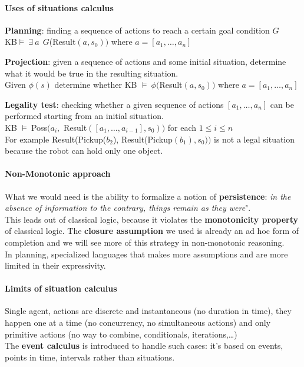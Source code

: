 \documentclass[10pt]{report}
\begin{document}
\paragraph{Uses of situations calculus} \begin{list}{}{}
	\item \textbf{Planning}: finding a sequence of actions to reach a certain goal condition $G$\\
	KB$\vDash\:\exists\:a\:\:G$(Result$(a,s_0))$ where $a = [a_1,\ldots,a_n]$
	\item \textbf{Projection}: given a sequence of actions and some initial situation, determine what it would be true in the resulting situation.\\
	Given $\phi(s)$ determine whether KB $\vDash\:\phi($Result$(a,s_0))$ where $a = [a_1,\ldots,a_n]$
	\item \textbf{Legality test}: checking whether a given sequence of actions $[a_1,\ldots,a_n]$ can be performed starting from an initial situation.\\
	KB $\vDash\:$Poss$(a_i,$ Result$([a_1,\ldots,a_{i-1}],s_0))$ for each $1\leq i\leq n$\\
	For example Result(Pickup($b_2$), Result(Pickup$(b_1),s_0))$ is not a legal situation because the robot can hold only one object.
\end{list}
\paragraph{Non-Monotonic approach} What we would need is the ability to formalize a notion of \textbf{persistence}: \textit{in the absence of information to the contrary, things remain as they were}".\\
This leads out of classical logic, because it violates the \textbf{monotonicity property} of classical logic. The \textbf{closure assumption} we used is already an ad hoc form of completion and we will see more of this strategy in non-monotonic reasoning.\\
In planning, specialized languages that makes more assumptions and are more limited in their expressivity.
\paragraph{Limits of situation calculus} Single agent, actions are discrete and instantaneous (no duration in time), they happen one at a time (no concurrency, no simultaneous actions) and only primitive actions (no way to combine, conditionals, iterations,\ldots)\\
The \textbf{event calculus} is introduced to handle such cases: it's based on events, points in time, intervals rather than situations.
\end{document}
